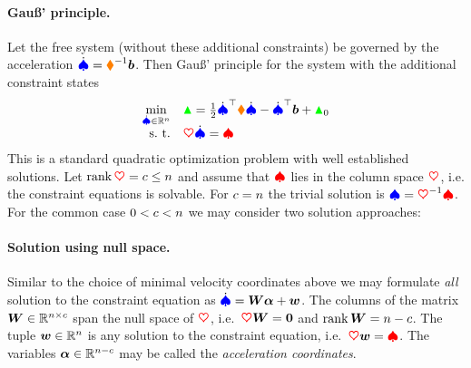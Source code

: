 \paragraph{Gauß' principle.}
Let the free system (without these additional constraints) be governed by the acceleration $\sysVeld = \sysInertiaMat^{-1}\sysForce$.
Then Gauß' principle for the system with the additional constraint states
\begin{align}\label{eq:GaussPrincipleAccConstraints}
 \begin{array}{rl}
  \minOp[\sysVeld\in\RealNum^{\dimConfigSpace}] & \GaussianConstraint = \tfrac{1}{2} \sysVeld^\top \sysInertiaMat \sysVeld - \sysVeld^\top \sysForce + \GaussianConstraint_0 \\
  \text{s.\ t.} & \accConstraintMat \sysVeld = \accConstraintB
 \end{array}
\end{align}
This is a standard quadratic optimization problem with well established solutions.
Let $\rank\accConstraintMat = c \leq \dimConfigSpace$ and assume that $\accConstraintB$ lies in the column space $\accConstraintMat$, i.e. the constraint equations is solvable.
For $c=\dimConfigSpace$ the trivial solution is $\sysVel = \accConstraintMat^{-1}\accConstraintB$.
For the common case $0 < c < \dimConfigSpace$ we may consider two solution approaches:

\paragraph{Solution using null space.}
Similar to the choice of minimal velocity coordinates above \fixme{[link]} we may formulate \textit{all} solution to the constraint equation as $\sysVeld = \mat{W}\tuple{\alpha} + \tuple{w}$.
The columns of the matrix $\mat{W}\in\RealNum^{\dimConfigSpace\times c}$ span the null space of $\accConstraintMat$, i.e.\ $\accConstraintMat \mat{W}=\mat{0}$ and $\rank\mat{W} = \dimConfigSpace-c$. 
The tuple $\tuple{w} \in \RealNum^\dimConfigSpace$ is any solution to the constraint equation, i.e.\ $\accConstraintMat\tuple{w} = \accConstraintB$.
The variables $\tuple{\alpha} \in \RealNum^{\dimConfigSpace-c}$ may be called the \textit{acceleration coordinates}.

